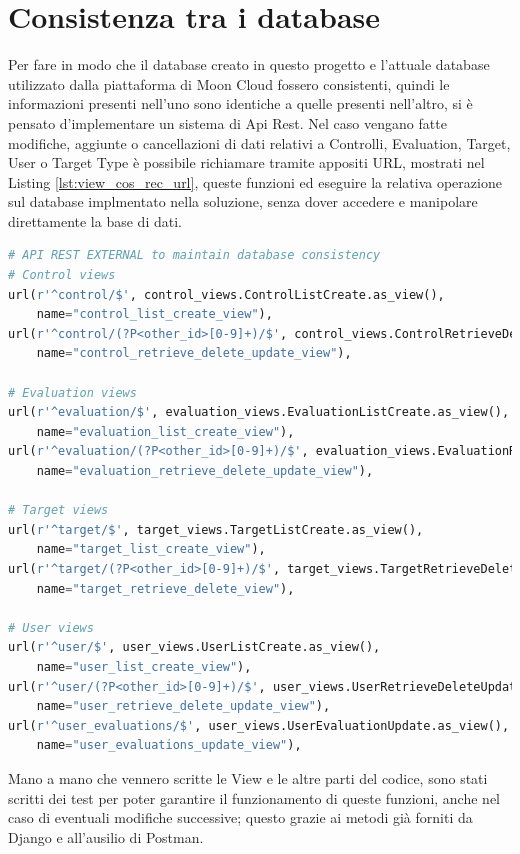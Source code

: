 \section*{Consistenza tra i database}
Per fare in modo che il database creato in questo progetto e l'attuale database utilizzato dalla piattaforma di Moon Cloud 
fossero consistenti, quindi le informazioni presenti nell'uno sono identiche a quelle presenti nell'altro, si è 
pensato d'implementare un sistema di Api Rest.\hfill\break
Nel caso vengano fatte modifiche, aggiunte o cancellazioni di dati relativi a Controlli, Evaluation, Target, User o Target Type 
è possibile richiamare tramite appositi URL, mostrati nel Listing \ref{lst:view_cos_rec_url}, queste funzioni ed eseguire la relativa 
operazione sul database implmentato nella soluzione, senza dover accedere e manipolare direttamente la base di dati.
\lstset{style=python_code_style}
\begin{lstlisting}[language=Python, label=lst:view_cos_rec_url, caption={Porzione di codice dell'URL Mapper contenti le URL usate per 
    mantenere la consistenza dei dati.}]
# API REST EXTERNAL to maintain database consistency
# Control views
url(r'^control/$', control_views.ControlListCreate.as_view(),
    name="control_list_create_view"),
url(r'^control/(?P<other_id>[0-9]+)/$', control_views.ControlRetrieveDeleteUpdate.as_view(),
    name="control_retrieve_delete_update_view"),

# Evaluation views
url(r'^evaluation/$', evaluation_views.EvaluationListCreate.as_view(),
    name="evaluation_list_create_view"),
url(r'^evaluation/(?P<other_id>[0-9]+)/$', evaluation_views.EvaluationRetrieveDeleteUpdate.as_view(),
    name="evaluation_retrieve_delete_update_view"),

# Target views
url(r'^target/$', target_views.TargetListCreate.as_view(),
    name="target_list_create_view"),
url(r'^target/(?P<other_id>[0-9]+)/$', target_views.TargetRetrieveDelete.as_view(),
    name="target_retrieve_delete_view"),

# User views
url(r'^user/$', user_views.UserListCreate.as_view(),
    name="user_list_create_view"),
url(r'^user/(?P<other_id>[0-9]+)/$', user_views.UserRetrieveDeleteUpdate.as_view(),
    name="user_retrieve_delete_update_view"),
url(r'^user_evaluations/$', user_views.UserEvaluationUpdate.as_view(),
    name="user_evaluations_update_view"),
\end{lstlisting}
%
Mano a mano che vennero scritte le View e le altre parti del codice, sono stati scritti dei test per poter garantire il funzionamento di queste 
funzioni, anche nel caso di eventuali modifiche successive; questo grazie ai metodi già forniti da Django e all'ausilio di Postman.
%
